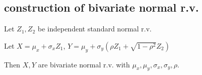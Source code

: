     \subsection*{construction of bivariate normal r.v.}
        Let $Z_1, Z_2$ be independent standard normal r.v.

        Let $X = \mu_x + \sigma_xZ_1$, $Y = \mu_y + \sigma_y(\rho Z_1 + \sqrt{1-\rho^2}Z_2)$

        Then $X, Y$ are bivariate normal r.v. with $\mu_x, \mu_y, \sigma_x, \sigma_y, \rho$.
        

       
        

   